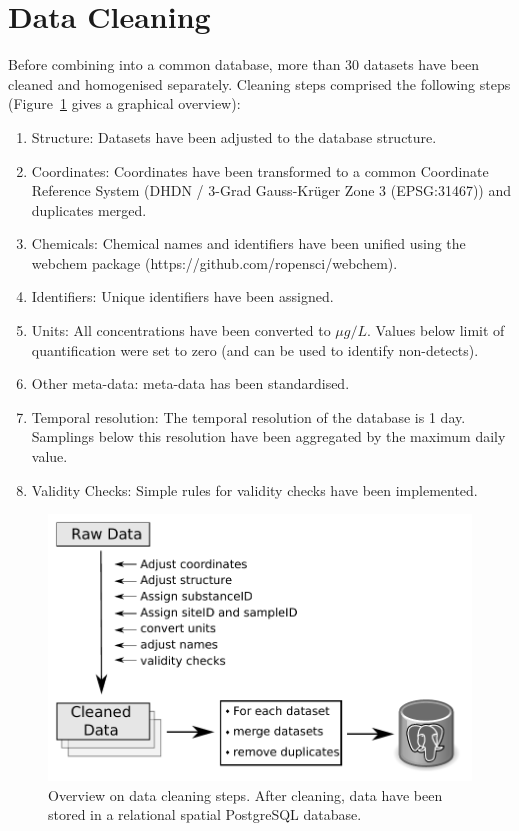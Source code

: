 




\section{Data Cleaning}
Before combining into a common database, more than 30 datasets have been cleaned and homogenised separately.
Cleaning steps comprised the following steps (Figure~\ref{fig:data_cleaning} gives a graphical overview):

\begin{enumerate}
	\item Structure: Datasets have been adjusted to the database structure.
	\item Coordinates: Coordinates have been transformed to a common Coordinate Reference System (DHDN / 3-Grad Gauss-Krüger Zone 3 (EPSG:31467)) and duplicates merged.
	\item Chemicals: Chemical names and identifiers have been unified using the webchem package (https://github.com/ropensci/webchem).
	\item  Identifiers: Unique identifiers have been assigned.
	\item Units: All concentrations have been converted to $\mu g/L$. Values below limit of quantification were set to zero (and can be used to identify non-detects).
	\item Other meta-data: meta-data has been standardised.
	\item Temporal resolution: The temporal resolution of the database is 1 day. Samplings below this resolution have been aggregated by the maximum daily value.
	\item Validity Checks: Simple rules for validity checks have been implemented.
\end{enumerate}

\begin{figure}[ht]
	\centering
	\includegraphics[width = \textwidth]{appendix/smallstreams/one/data_cleaning}
	\caption[Overview on data cleaning steps.]{Overview on data cleaning steps. After cleaning, data have been stored in a relational spatial PostgreSQL database.}
	\label{fig:data_cleaning}
\end{figure}



